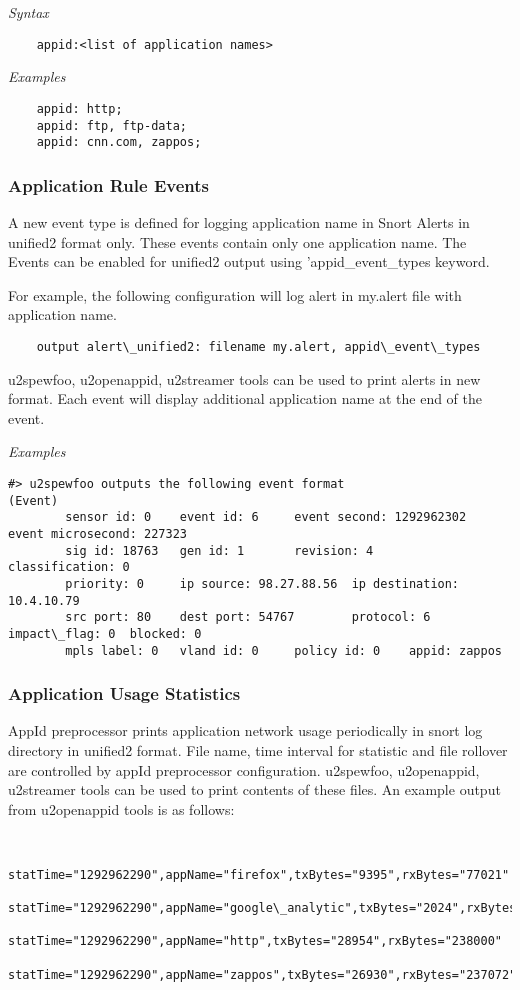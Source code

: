 \documentclass[english]{report}
\begin{document}
\textit{Syntax}
\footnotesize
\begin{verbatim}
    appid:<list of application names>
\end{verbatim}
\normalsize
\textit{Examples}
\footnotesize
\begin{verbatim}
    appid: http;
    appid: ftp, ftp-data;
    appid: cnn.com, zappos;
\end{verbatim}
\normalsize

\subsubsection{Application Rule Events}
A new event type is defined for logging application name in Snort
Alerts in unified2 format only. These events contain only one application name.
The Events can be enabled for unified2 output using 'appid\_event\_types keyword. 

For example, the following configuration will log alert in my.alert file with
application name.
\footnotesize
\begin{verbatim}
    output alert\_unified2: filename my.alert, appid\_event\_types
\end{verbatim}
\normalsize

u2spewfoo, u2openappid, u2streamer tools can be used to print alerts in new format. 
Each event will display additional application name at the end of the event.

\textit{Examples}
\footnotesize
\begin{verbatim}
#> u2spewfoo outputs the following event format
(Event)
        sensor id: 0    event id: 6     event second: 1292962302        event microsecond: 227323
        sig id: 18763   gen id: 1       revision: 4      classification: 0
        priority: 0     ip source: 98.27.88.56  ip destination: 10.4.10.79
        src port: 80    dest port: 54767        protocol: 6     impact\_flag: 0  blocked: 0
        mpls label: 0   vland id: 0     policy id: 0    appid: zappos
\end{verbatim}
\normalsize

\subsubsection{Application Usage Statistics}

AppId preprocessor prints application network usage periodically in snort
log directory in unified2 format. File name, time interval for statistic and
file rollover are controlled by appId preprocessor configuration. u2spewfoo,
u2openappid, u2streamer tools can be used to print contents of these files. An
example output from u2openappid tools is as follows:
\footnotesize
\begin{verbatim}

    statTime="1292962290",appName="firefox",txBytes="9395",rxBytes="77021"
    statTime="1292962290",appName="google\_analytic",txBytes="2024",rxBytes="928"
    statTime="1292962290",appName="http",txBytes="28954",rxBytes="238000"
    statTime="1292962290",appName="zappos",txBytes="26930",rxBytes="237072"
\end{verbatim}
\normalsize
\end{document}
